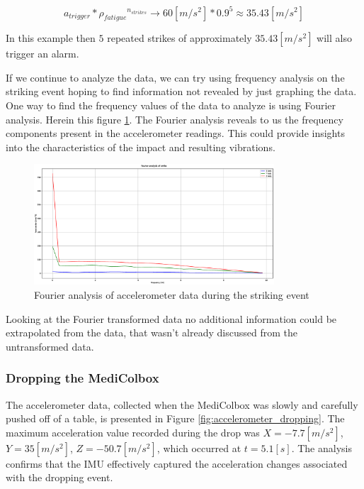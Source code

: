 \documentclass[../main.tex]{subfiles}
\begin{document}
$$a_{trigger} * {\rho_{fatigue}}^{n_{strikes}} \rightarrow 60 [m/s^2] * 0.9^5 \approx 35.43 [m/s^2] $$

In this example then $5$ repeated strikes of approximately $35.43 [m/s^2]$ will also trigger an alarm.


If we continue to analyze the data, we can try using frequency analysis on the striking event hoping to find information not revealed by just graphing the data. One way to find the frequency values of the data to analyze is using Fourier analysis. Herein this figure \ref{fig:fourier_accelerometer_striking}.
The Fourier analysis reveals to us the frequency components present in the accelerometer readings. This could
provide insights into the characteristics of the
impact and resulting vibrations.

\begin{figure}[htbp]
    \centering
    \includegraphics[width=0.8\textwidth]{resources/figures/Fourier_acceleration_strike.eps}
    \caption{Fourier analysis of accelerometer data during the striking event}
    \label{fig:fourier_accelerometer_striking}
\end{figure}

Looking at the Fourier transformed data no additional information could be extrapolated from the data, that wasn't already discussed from the untransformed data.

\clearpage
\subsubsection{Dropping the MediColbox}

The accelerometer data, collected when the MediColbox was slowly and carefully
pushed off of a table, is presented in
Figure \ref{fig:accelerometer_dropping}.
The maximum acceleration value recorded during the
drop was
$X = -7.7 [m/s^2]$, $Y = 35 [m/s^2]$, $Z = -50.7 [m/s^2]$,
which occurred at $t = 5.1[s]$.
The analysis confirms that the IMU effectively captured the
acceleration changes associated with the dropping event.
\end{document}
